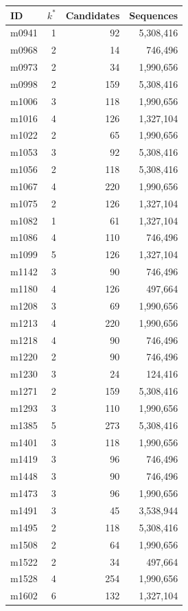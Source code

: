 \documentclass[10pt,a4paper]{article}
\begin{document}
\begin{table}[h!]\centering\small\renewcommand{\arraystretch}{0.91}
\begin{tabular}{lrrr}\toprule ID & $k^*$ & Candidates & Sequences\\\midrule
m0941 & 1 & 92 & 5,308,416\\
m0968 & 2 & 14 & 746,496\\
m0973 & 2 & 34 & 1,990,656\\
m0998 & 2 & 159 & 5,308,416\\
m1006 & 3 & 118 & 1,990,656\\
m1016 & 4 & 126 & 1,327,104\\
m1022 & 2 & 65 & 1,990,656\\
m1053 & 3 & 92 & 5,308,416\\
m1056 & 2 & 118 & 5,308,416\\
m1067 & 4 & 220 & 1,990,656\\
m1075 & 2 & 126 & 1,327,104\\
m1082 & 1 & 61 & 1,327,104\\
m1086 & 4 & 110 & 746,496\\
m1099 & 5 & 126 & 1,327,104\\
m1142 & 3 & 90 & 746,496\\
m1180 & 4 & 126 & 497,664\\
m1208 & 3 & 69 & 1,990,656\\
m1213 & 4 & 220 & 1,990,656\\
m1218 & 4 & 90 & 746,496\\
m1220 & 2 & 90 & 746,496\\
m1230 & 3 & 24 & 124,416\\
m1271 & 2 & 159 & 5,308,416\\
m1293 & 3 & 110 & 1,990,656\\
m1385 & 5 & 273 & 5,308,416\\
m1401 & 3 & 118 & 1,990,656\\
m1419 & 3 & 96 & 746,496\\
m1448 & 3 & 90 & 746,496\\
m1473 & 3 & 96 & 1,990,656\\
m1491 & 3 & 45 & 3,538,944\\
m1495 & 2 & 118 & 5,308,416\\
m1508 & 2 & 64 & 1,990,656\\
m1522 & 2 & 34 & 497,664\\
m1528 & 4 & 254 & 1,990,656\\
m1602 & 6 & 132 & 1,327,104\\

\end{tabular}
\end{table}
\end{document}
